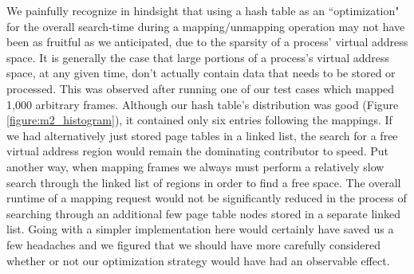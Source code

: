 We painfully recognize in hindsight that using a hash table as an ``optimization" for the overall search-time during a mapping/unmapping operation may not have been as fruitful as we anticipated, due to the sparsity of a process' virtual address space. It is generally the case that large portions of a process's virtual address space, at any given time, don't actually contain data that needs to be stored or processed. This was observed after running one of our test cases which mapped 1,000 arbitrary frames. Although our hash table's distribution was good (Figure \ref{figure:m2_histogram}), it contained only six entries following the mappings. If we had alternatively just stored page tables in a linked list, the search for a free virtual address region would remain the dominating contributor to speed. Put another way, when mapping frames we always must perform a relatively slow search through the linked list of regions in order to find a free space. The overall runtime of a mapping request would not be significantly reduced in the process of searching through an additional few page table nodes stored in a separate linked list. Going with a simpler implementation here would certainly have saved us a few headaches and we figured that we should have more carefully considered whether or not our optimization strategy would have had an observable effect. 

